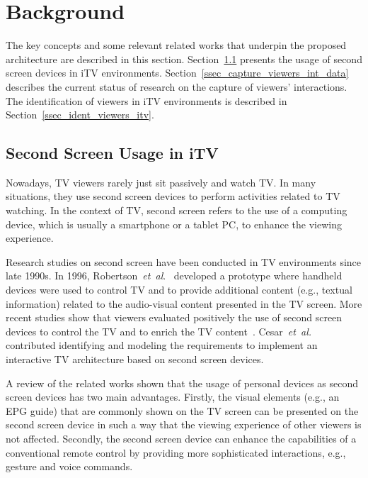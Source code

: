 \documentclass[journal]{IEEEtran}
\begin{document}
\section{Background}

The key concepts and some relevant related works that underpin the proposed architecture are described in this section. Section~\ref{ssec_ss_usage} presents the usage of second screen devices in iTV environments. Section~\ref{ssec_capture_viewers_int_data} describes the current status of research on the capture of viewers' interactions. The identification of viewers in iTV environments is described in Section~\ref{ssec_ident_viewers_itv}.

\subsection{Second Screen Usage in iTV}
\label{ssec_ss_usage}

Nowadays, TV viewers rarely just sit passively and watch TV. In many situations, they use second screen devices to perform activities related to TV watching. In the context of TV, second screen refers to the use of a computing device, which is usually a smartphone or a tablet PC, to enhance the viewing experience.

Research studies on second screen have been conducted in TV environments since late 1990s. In 1996, Robertson~\emph{et~al}.~\cite{Robertson1996} developed a prototype where handheld devices were used to control TV and to provide additional content (e.g., textual information) related to the audio-visual content presented in the TV screen. More recent studies show that viewers evaluated positively the use of second screen devices to control the TV and to enrich the TV content~\cite{Cesar2008,Cesar2011,Tsekleves2011}. Cesar~\emph{et~al.}~\cite{Cesar2009} contributed identifying and modeling the requirements to implement an interactive TV architecture based on second screen devices.

A review of the related works shown that the usage of personal devices as second screen devices has two main advantages. Firstly, the visual elements (e.g., an EPG guide) that are commonly shown on the TV screen can be presented on the second screen device in such a way that the viewing experience of other viewers is not affected. Secondly, the second screen device can enhance the capabilities of a conventional remote control by providing more sophisticated interactions, e.g., gesture and voice commands. 
\end{document}
